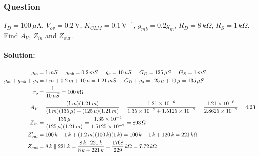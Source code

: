 \subsubsection{Question}
\(I_D = 100\,\mu\)A, \(V_{ov} = 0.2\,\)V, \(K_{CLM} = 0.1\,\)V\(^{-1}\),
\(g_{mb} = 0.2 g_m\), \(R_D = 8\,k\Omega\), \(R_S = 1\,k\Omega\). Find
\(A_{V}\), \(Z_{in}\) and \(Z_{out}\).
\paragraph{Solution:}
\begin{align*}
  g_m &= 1\,mS \hspace{0.5cm} g_{mb} = 0.2\,mS \hspace{0.5cm} g_o = 10\,\mu S \hspace{0.5cm} G_D = 125\,\mu S \hspace{0.5cm} G_S = 1\,mS \\
  g_m + g_{mb} + g_o &= 1\,m + 0.2\,m + 10\,\mu = 1.21\,mS \hspace{0.5cm} G_D + g_o = 125\,\mu + 10\,\mu = 135\,\mu S \\
  r_o & = \frac{1}{10\,\mu S} = 100\,k\Omega \\
  A_V &= \frac{(1\,m)(1.21\,m)}{(1\,m)(135\,\mu) + (125\,\mu)(1.21\,m)} = \frac{1.21 \times 10^{-6}}{1.35 \times 10^{-7} + 1.5125 \times 10^{-7}} = \frac{1.21 \times 10^{-6}}{2.8625 \times 10^{-7}} = 4.23 \\
  Z_{in} &= \frac{135\,\mu}{(125\,\mu)(1.21\,m)} = \frac{1.35 \times 10^{-4}}{1.5125 \times 10^{-7}} = 893\,\Omega \\
  Z'_{out} &= 100\,k + 1\,k + (1.2\,m)(100\,k)(1\,k) = 100\,k + 1\,k + 120\,k = 221\,k\Omega \\
  Z_{out} &= 8\,k \parallel 221\,k = \frac{8\,k \cdot 221\,k}{8\,k + 221\,k} = \frac{1768}{229}\,k\Omega = 7.72\,k\Omega
\end{align*}


